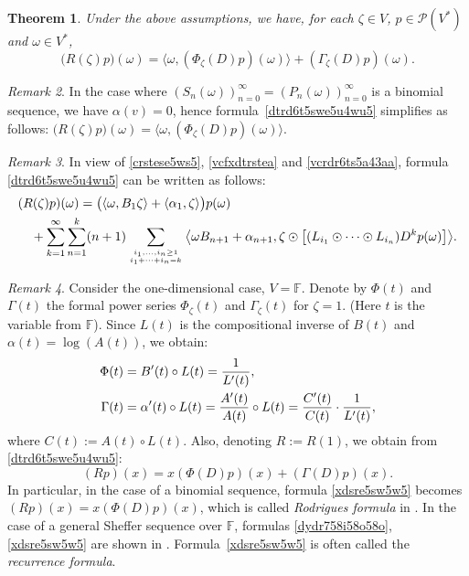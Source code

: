 \documentclass[12pt]{article}
\newtheorem{theorem}{Theorem}[section]
\theoremstyle{remark}
\theoremstyle{remark}
\theoremstyle{remark}
\newtheorem{remark}[theorem]{Remark}
\begin{document}
\begin{theorem}\label{dzerste7kui7} Under the above assumptions, we have, for each $\zeta\in V$, $p\in\mathcal P(V^*)$ and $\omega\in V^*$,
\begin{equation}\label{dtrd6t5swe5u4wu5}
\big(R(\zeta)p\big)(\omega)=
\big\langle\omega, (\Phi_\zeta(D)p)(\omega)\big\rangle+ (\Gamma_\zeta(D)p)(\omega). 
\end{equation}
\end{theorem}


\begin{remark} In the case where $(S_n(\omega))_{n=0}^\infty=(P_n(\omega))_{n=0}^\infty$ is a binomial sequence, we have $\alpha(v)=0$, hence formula~\eqref{dtrd6t5swe5u4wu5} simplifies as follows: $ \big(R(\zeta)p\big)(\omega)=
\big\langle\omega, (\Phi_\zeta(D)p)(\omega)\big\rangle$. \end{remark}


\begin{remark}
In view of  \eqref{crstese5ws5},  \eqref{vcfxdtrstea} and \eqref{vcrdr6ts5a43aa}, formula \eqref{dtrd6t5swe5u4wu5} can be written as follows:
\begin{align}
&(R(\zeta)p)(\omega)=\big(\langle\omega, B_1\zeta\rangle+\langle\alpha_1,\zeta\rangle\big) p(\omega)\notag\\
&\quad+\sum_{k=1}^\infty \sum_{n=1}^k(n+1) \sum_{i_1,\dots,i_n \geq 1 \atop i_1+\dots+i_n=k} 
\big\langle \omega B_{n+1}+\alpha_{n+1},\zeta\odot\big[(L_{i_1}\odot\dots\odot L_{i_n}) D^{k}p(\omega)\big]\big\rangle.\label{vcryds6uei}
\end{align}
\end{remark}




\begin{remark} \label{cftsts6e}
Consider the one-dimensional case, $V=\mathbb F$. Denote by $\Phi(t)$ and $\Gamma(t)$ the formal power series $\Phi_\zeta(t)$ and $\Gamma_\zeta(t)$ for $\zeta=1$. (Here $t$ is 
the variable from $\mathbb F$). Since $L(t)$ is the compositional inverse of $B(t)$ and $\alpha(t)=\log(A(t))$, we obtain:
\begin{align}
\Phi(t)&=B'(t)\circ L(t)=\frac 1{L'(t)},\notag\\
 \Gamma(t)&=\alpha'(t)\circ L(t)=\frac{A'(t)}{A(t)}\circ L(t)=\frac{C'(t)}{C(t)}\cdot \frac 1{L'(t)},\label{dydr758i58o58o}
 \end{align} 
where $C(t):=A(t)\circ L(t)$. Also, denoting $R:=R(1)$, we obtain from \eqref{dtrd6t5swe5u4wu5}: 
\begin{equation}\label{xdsre5sw5w5}
(Rp)(x)=x(\Phi(D)p)(x)+(\Gamma(D)p)(x).
\end{equation}
 In particular, in the case of a binomial sequence, formula \eqref{xdsre5sw5w5} becomes $(Rp)(x)=x(\Phi(D)p)(x)$, which is  called {\it Rodrigues formula\/} in \cite[Section~4, Theorem~4~(4)]{RotaKahanerOdlyzko}. In the case of a general Sheffer sequence over $\mathbb F$, formulas \eqref{dydr758i58o58o}, \eqref{xdsre5sw5w5} are shown in \cite[Theorem~3.7.1]{Roman}. Formula~\eqref{xdsre5sw5w5} is often called the {\it recurrence formula}.

\end{remark}
\end{document}
